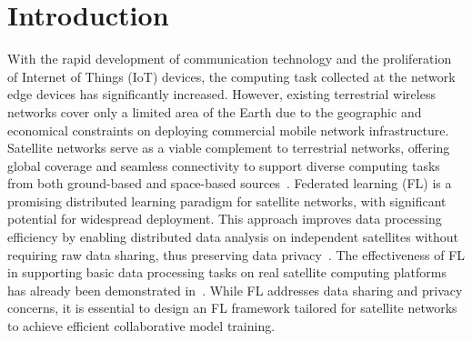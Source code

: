\section{Introduction}



With the rapid development of communication technology and the proliferation of Internet of Things (IoT) devices, the computing task collected at the network edge devices has significantly increased. However, existing terrestrial wireless networks cover only a limited area of the Earth due to the geographic and economical constraints on deploying commercial mobile network infrastructure. Satellite networks serve as a viable complement to terrestrial networks, offering global coverage and seamless connectivity to support diverse computing tasks from both ground-based and space-based sources~\cite{MahboobCST24,PengISCC24}. %
Federated learning (FL) is a promising distributed learning paradigm for satellite networks, with significant potential for widespread deployment. This approach improves data processing efficiency by enabling distributed data analysis on independent satellites without requiring raw data sharing, thus preserving data privacy~\cite{ChenWC22,ShenCSUR23,FontanesiCST25}. The effectiveness of FL in supporting basic data processing tasks on real satellite computing platforms has already been demonstrated in~\cite{TangTMC24}. While FL addresses data sharing and privacy concerns, it is essential to design an FL framework tailored for satellite networks to achieve efficient collaborative model training.


